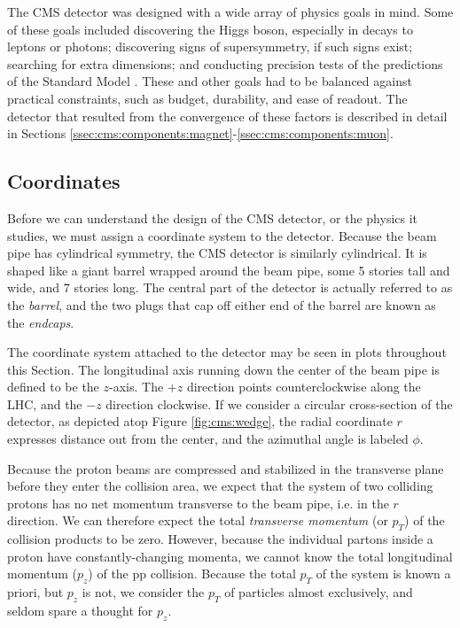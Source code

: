 The CMS detector was designed with a wide array of physics goals in
mind. Some of these goals included discovering the Higgs boson,
especially in decays to leptons or photons; discovering signs of
supersymmetry, if such signs exist; searching for extra
dimensions; and conducting precision tests of the predictions of the
Standard Model \cite{tdr}.
These and other goals had to be balanced against practical
constraints, such as budget, durability, and ease of readout. The
detector that resulted from the convergence of these factors is
described in detail in Sections
\ref{ssec:cms:components:magnet}-\ref{ssec:cms:components:muon}.

\subsection{Coordinates}
\label{ssec:cms:coordinates}


Before we can understand the design of the CMS detector, or the
physics it studies, we must assign a coordinate system to the detector.
Because the beam pipe has cylindrical symmetry, the CMS detector is
similarly cylindrical. It is shaped like a giant barrel wrapped around
the beam pipe, some 5 stories tall and wide, and 7 stories
long. The central part of the detector is actually referred to as the
\emph{barrel}, and the two plugs that cap off either end of the barrel
are known as the \emph{endcaps}.

The coordinate system attached to the detector may be seen in
plots throughout this Section. The longitudinal axis running down the
center of the beam pipe is defined to be the $z$-axis. The $+z$
direction points counterclockwise along the LHC, and the $-z$
direction clockwise. If we consider a circular
cross-section of the detector, as depicted atop Figure
\ref{fig:cms:wedge}, the radial coordinate $r$ expresses distance out from
the center, and the azimuthal angle is labeled $\phi$.

Because the proton beams are compressed and stabilized in the
transverse plane before they enter the collision area, we expect
that the system of two colliding protons has no net momentum
transverse to the beam pipe, i.e. in the $r$ direction. We can
therefore expect the total \emph{transverse momentum} (or $p_T$) of
the collision products to be zero. However, because the individual
partons inside a proton have constantly-changing momenta, we cannot
know the total longitudinal momentum ($p_z$) of the pp
collision. Because the total $p_T$ of the system is known a priori,
but $p_z$ is not, we consider the $p_T$ of particles almost
exclusively, and seldom spare a thought for $p_z$.

